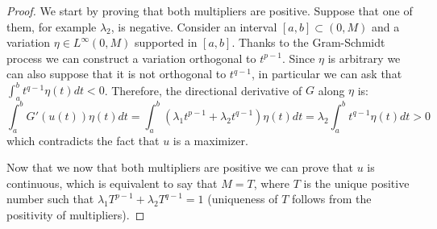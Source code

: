 \documentclass[corpo=11pt, stile=classica, tipotesi=custom,
greek, evenboxes, english]{toptesi}
\numberwithin{equation}{chapter}
\theoremstyle{remark}
\begin{document}
\begin{proof}
We start by proving that both multipliers are positive. Suppose that one of them, for example $\lambda_2$, is negative. Consider an interval $[a,b] \subset (0,M)$ and a variation $\eta \in L^{\infty}(0,M)$ supported in $[a,b]$. Thanks to the Gram-Schmidt process we can construct a variation orthogonal to $t^{p-1}$. Since $\eta$ is arbitrary we can also suppose that it is not orthogonal to $t^{q-1}$, in particular we can ask that $\int_{a}^{b}t^{q-1}\eta(t)dt <0$. Therefore, the directional derivative of $G$ along $\eta$ is:
\begin{equation*}
	\int_{a}^{b} G'(u(t))\eta(t)dt = \int_{a}^{b} (\lambda_1 t^{p-1} + \lambda_2 t^{q-1})\eta(t)dt = \lambda_2 \int_{a}^{b} t^{q-1} \eta(t)dt > 0
\end{equation*}
which contradicts the fact that $u$ is a maximizer.

Now that we now that both multipliers are positive we can prove that $u$ is continuous, which is equivalent to say that $M=T$, where $T$ is the unique positive number such that $\lambda_1 T^{p-1} + \lambda_2 T^{q-1} = 1$ (uniqueness of $T$ follows from the positivity of multipliers).


\end{proof}
\end{document}
